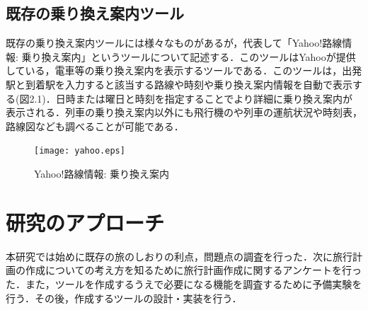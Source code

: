 \documentclass{funthesis}
\begin{document}
\section{既存の乗り換え案内ツール}
既存の乗り換え案内ツールには様々なものがあるが，代表して「Yahoo!路線情報: 乗り換え案内」\cite{yahoo}というツールについて記述する．このツールはYahooが提供している，電車等の乗り換え案内を表示するツールである．このツールは，出発駅と到着駅を入力すると該当する路線や時刻や乗り換え案内情報を自動で表示する(図2.1)．日時または曜日と時刻を指定することでより詳細に乗り換え案内が表示される．列車の乗り換え案内以外にも飛行機のや列車の運航状況や時刻表，路線図なども調べることが可能である．

\begin{figure}[htpb]
\begin{center}
\texttt{[image: yahoo.eps]}
\end{center}
\caption{Yahoo!路線情報: 乗り換え案内}
\end{figure}



\chapter{研究のアプローチ}%

本研究では始めに既存の旅のしおりの利点，問題点の調査を行った．次に旅行計画の作成についての考え方を知るために旅行計画作成に関するアンケートを行った．また，ツールを作成するうえで必要になる機能を調査するために予備実験を行う．その後，作成するツールの設計・実装を行う．






\end{document}
